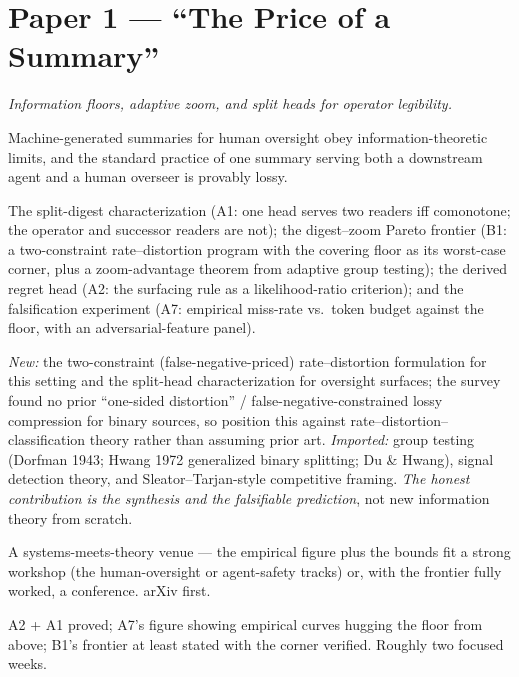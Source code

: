 \documentclass[11pt,a4paper]{article}
\begin{document}
\section{Paper 1 --- ``The Price of a Summary''}
\emph{Information floors, adaptive zoom, and split heads for operator legibility.}
\begin{description}[leftmargin=0em,style=unboxed]
\item[Thesis.] Machine-generated summaries for human oversight obey information-theoretic limits, and the standard practice of one summary serving both a downstream agent and a human overseer is provably lossy.
\item[Results.] The split-digest characterization (A1: one head serves two readers iff comonotone; the operator and successor readers are not); the digest--zoom Pareto frontier (B1: a two-constraint rate--distortion program with the covering floor as its worst-case corner, plus a zoom-advantage theorem from adaptive group testing); the derived regret head (A2: the surfacing rule as a likelihood-ratio criterion); and the falsification experiment (A7: empirical miss-rate vs.\ token budget against the floor, with an adversarial-feature panel).
\item[Novelty, honestly.] \emph{New:} the two-constraint (false-negative-priced) rate--distortion formulation for this setting and the split-head characterization for oversight surfaces; the survey found no prior ``one-sided distortion'' / false-negative-constrained lossy compression for binary sources, so position this against rate--distortion--classification theory rather than assuming prior art. \emph{Imported:} group testing (Dorfman 1943; Hwang 1972 generalized binary splitting; Du \& Hwang), signal detection theory, and Sleator--Tarjan-style competitive framing. \emph{The honest contribution is the synthesis and the falsifiable prediction}, not new information theory from scratch.
\item[Venue.] A systems-meets-theory venue --- the empirical figure plus the bounds fit a strong workshop (the human-oversight or agent-safety tracks) or, with the frontier fully worked, a conference. arXiv first.
\item[Gate.] A2 + A1 proved; A7's figure showing empirical curves hugging the floor from above; B1's frontier at least stated with the corner verified. Roughly two focused weeks.
\end{description}
\end{document}
